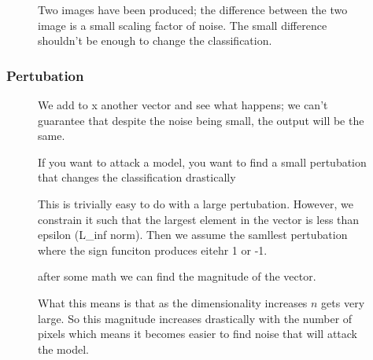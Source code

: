 \documentclass[11pt]{article}
\begin{document}
\begin{figure}[H]
    \centering
    \caption{Two images have been produced; the difference between the two image is a small scaling factor of noise. The small difference shouldn't be enough to change the classification.}
\end{figure}

\subsubsection{Pertubation}

\begin{figure}[H]
    \centering
    \caption{We add to x another vector and see what happens; we can't guarantee that despite the noise being small, the output will be the same.}
\end{figure}

\begin{figure}[H]
    \centering
    \caption{If you want to attack a model, you want to find a small pertubation that changes the classification drastically}
\end{figure}

\begin{figure}[H]
    \centering
    \caption{This is trivially easy to do with a large pertubation. However, we constrain it such that the largest element in the vector is less than epsilon (L\_inf norm). Then we assume the samllest pertubation where the sign funciton produces eitehr 1 or -1.}
\end{figure}

\begin{figure}[H]
    \centering
    \caption{after some math we can find the magnitude of the vector.}
\end{figure}

\begin{figure}[H]
    \centering
    \caption{What this means is that as the dimensionality increases $n$ gets very large. So this magnitude increases drastically with the number of pixels which means it becomes easier to find noise that will attack the model.}
\end{figure}
\end{document}
